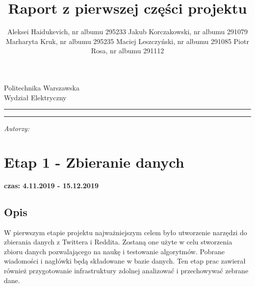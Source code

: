 \documentclass[a4paper,11pt, notitlepage ]{article}
\author{Aleksei Haidukevich, nr albumu 295233 \newline Jakub Korczakowski, nr albumu 291079 \newline Marharyta Kruk, nr albumu 295235 \newline Maciej Leszczyński, nr albumu 291085 \newline Piotr Rosa, nr albumu 291112}
\title{Raport z pierwszej części projektu}
\makeatletter
\newcommand{\linia}{\rule{\linewidth}{0.4mm}}
\renewcommand{\maketitle}{\begin{titlepage}
    \vspace*{1cm}
    \begin{center}\small
    Politechnika Warszawska\\
    Wydział Elektryczny
    \end{center}
    \vspace{3cm}
    \noindent\linia
    \begin{center}
      \LARGE \textsc{\@title}
         \end{center}
     \linia
    \vspace{0.5cm}
    \begin{flushright}
    \begin{minipage}{8cm}
    \textit{\small Autorzy:}\\
    \normalsize \textsc{\@author} \par
    \end{minipage}
    \end{flushright}
    \vspace*{\stretch{6}}
    \begin{center}
    \@date
    \end{center}
  \end{titlepage}%
}
\makeatother
\begin{document}
\maketitle
\setcounter{page}{2}
\tableofcontents
\newpage

\section{Etap 1 - Zbieranie danych}
\textbf{czas: 4.11.2019 - 15.12.2019}
\subsection{Opis} 
W pierwszym etapie projektu najważniejszym celem było utworzenie narzędzi do zbierania danych z Twittera i Reddita. Zostaną one użyte w celu stworzenia zbioru danych pozwalającego na naukę i testowanie algorytmów. Pobrane wiadomości i nagłówki będą składowane w bazie danych. Ten etap prac zawierał również przygotowanie infrastruktury zdolnej analizować i przechowywać zebrane dane.
\end{document}

